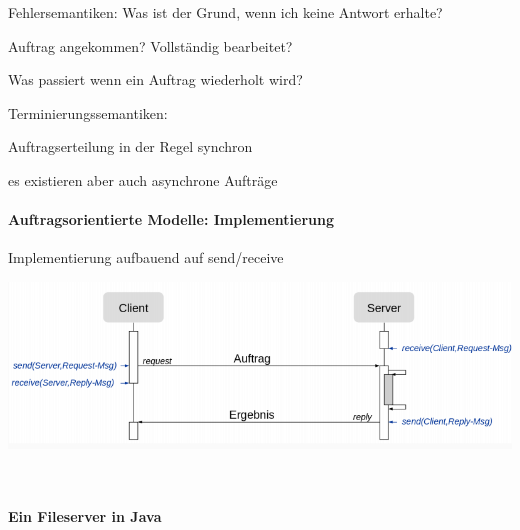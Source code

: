 \documentclass[10pt]{article}
\begin{document}
\begin{itemize*}
  \item Fehlersemantiken: Was ist der Grund, wenn ich keine Antwort erhalte?
  \begin{itemize*}
    \item Auftrag angekommen? Vollständig bearbeitet?
    \item Was passiert wenn ein Auftrag wiederholt wird?
  \end{itemize*}
  \item Terminierungssemantiken:
  \begin{itemize*}
    \item Auftragserteilung in der Regel synchron
    \item es existieren aber auch asynchrone Aufträge
  \end{itemize*}
\end{itemize*}

\paragraph{Auftragsorientierte Modelle: Implementierung}

\begin{itemize*}
  \item Implementierung aufbauend auf send/receive
\end{itemize*}
\begin{center}
  \includegraphics[width=0.4\linewidth]{Assets/Programmierparadigmen-kommunikation}
\end{center} \ \linebreak

\paragraph{Ein Fileserver in Java}
\end{document}
